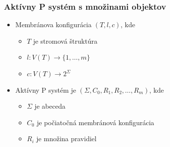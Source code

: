 
\begin{frame}[t]\frametitle{Aktívny P systém s množinami objektov}
  \begin{itemize}
    \item Membránova konfigurácia $(T, l, c)$, kde
    \begin{itemize}
      \item $T$ je stromová štruktúra
      \item $l: V(T) \rightarrow \{1, \ldots, m\}$
      \item $c: V(T) \rightarrow 2^\Sigma$
     \end{itemize}
     \item Aktívny P systém je $(\Sigma, C_0, R_1, R_2, \dots, R_m)$, kde
     \begin{itemize}
       \item $\Sigma$ je abeceda
       \item $C_0$ je počiatočná membránová konfigurácia
       \item $R_i$ je množina pravidiel
     \end{itemize}
  \end{itemize}
\end{frame}

